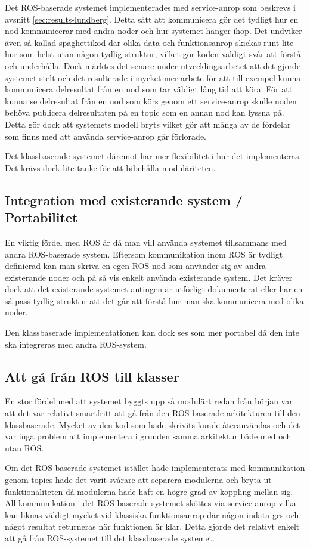 Det ROS-baserade systemet implementerades med service-anrop som beskrevs i avsnitt \ref{sec:results-lundberg}. Detta sätt att kommunicera gör det tydligt hur en nod kommunicerar med andra noder och hur systemet hänger ihop. Det undviker även så kallad spaghettikod där olika data och funktionsanrop skickas runt lite hur som helst utan någon tydlig struktur, vilket gör koden väldigt svår att förstå och underhålla. Dock märktes det senare under utvecklingsarbetet att det gjorde systemet stelt och det resulterade i mycket mer arbete för att till exempel kunna kommunicera delresultat från en nod som tar väldigt lång tid att köra. För att kunna se delresultat från en nod som körs genom ett service-anrop skulle noden behöva publicera delresultaten på en topic som en annan nod kan lyssna på. Detta gör dock att systemets modell bryts vilket gör att många av de fördelar som finns med att använda service-anrop går förlorade.

Det klassbaserade systemet däremot har mer flexibilitet i hur det implementeras. Det krävs dock lite tanke för att bibehålla moduläriteten.

\subsection{Integration med existerande system / Portabilitet}
En viktig fördel med ROS är då man vill använda systemet tillsammans med andra ROS-baserade system. Eftersom kommunikation inom ROS är tydligt definierad kan man skriva en egen ROS-nod som använder sig av andra existerande noder och på så vis enkelt använda existerande system. Det kräver dock att det existerande systemet antingen är utförligt dokumenterat eller har en så pass tydlig struktur att det går att förstå hur man ska kommunicera med olika noder.

Den klassbaserade implementationen kan dock ses som mer portabel då den inte ska integreras med andra ROS-system. 

\subsection{Att gå från ROS till klasser}
En stor fördel med att systemet byggts upp så modulärt redan från början var att det var relativt smärtfritt att gå från den ROS-baserade arkitekturen till den klassbaserade. Mycket av den kod som hade skrivits kunde återanvändas och det var inga problem att implementera i grunden samma arkitektur både med och utan ROS.

Om det ROS-baserade systemet istället hade implementerats med kommunikation genom topics hade det varit svårare att separera modulerna och bryta ut funktionaliteten då modulerna hade haft en högre grad av koppling mellan sig. All kommunikation i det ROS-baserade systemet sköttes via service-anrop vilka kan liknas väldigt mycket vid klassiska funktionsanrop där någon indata ges och något resultat returneras när funktionen är klar. Detta gjorde det relativt enkelt att gå från ROS-systemet till det klassbaserade systemet.

